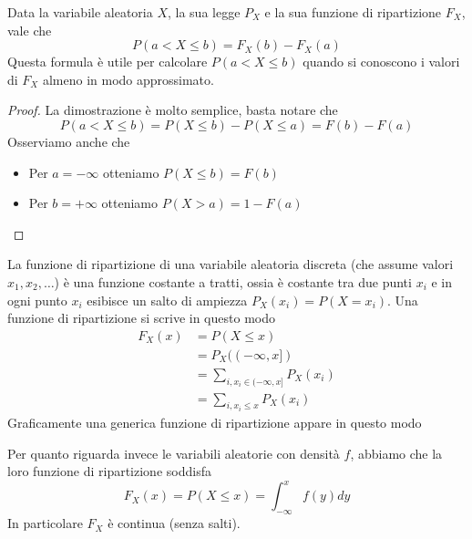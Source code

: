 \begin{theorem}
	Data la variabile aleatoria $X$, la sua legge $P_X$ e la sua funzione di ripartizione $F_X$, vale
	che
	\[ P(a < X \leq b) = F_X (b) - F_X(a) \]
	Questa formula è utile per calcolare $P(a < X \leq b)$ quando si conoscono i valori di $F_X$
	almeno in modo approssimato.
	\begin{proof}
		La dimostrazione è molto semplice, basta notare che
		\[ P(a < X \leq b) = P(X \leq b) - P(X \leq a) = F(b) - F(a) \]
		Osserviamo anche che
		\begin{itemize}
			\item Per $a = -\infty$ otteniamo $P(X \leq b) = F(b)$
			\item Per $b = +\infty$ otteniamo $P(X > a) = 1 - F(a)$
		\end{itemize}
	\end{proof}
\end{theorem}

La funzione di ripartizione di una variabile aleatoria discreta (che assume valori
$x_1, x_2, \dots$) è una funzione costante a tratti, ossia è costante tra due punti $x_i$ e in ogni
punto $x_i$ esibisce un salto di ampiezza $P_X(x_i) = P(X = x_i)$. Una funzione di ripartizione
si scrive in questo modo
\begin{align*}
	F_X(x) & = P(X \leq x)                              \\
	       & = P_X ((-\infty, x])                       \\
	       & = \sum_{i, x_i \in (-\infty, x]} P_X (x_i) \\
	       & = \sum_{i, x_i \leq x} P_X (x_i)
\end{align*}
Graficamente una generica funzione di ripartizione appare in questo modo
\begin{center}
\end{center}
Per quanto riguarda invece le variabili aleatorie con densità $f$, abbiamo che la loro funzione di
ripartizione soddisfa
\[ F_X(x) = P(X \leq x) = \int_{-\infty}^x f(y) dy \]
In particolare $F_X$ è continua (senza salti).

